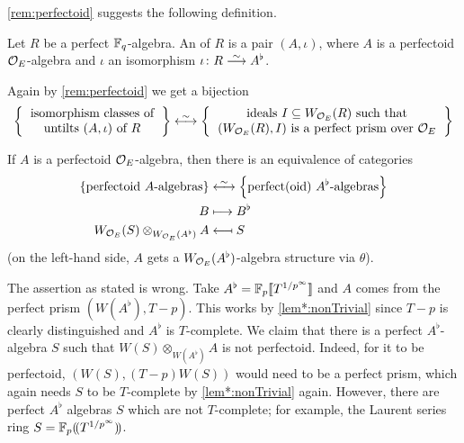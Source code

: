 \cref{rem:perfectoid} suggests the following definition.
\begin{defi}
	Let $R$ be a perfect $\mathbb{F}_q$-algebra. An  of $R$ is a pair $(A,\iota)$, where $A$ is a perfectoid $\mathcal{O}_E$-algebra and $\iota$ an isomorphism $\iota\colon R\isomorphism A^\flat$.
\end{defi}
Again by \cref{rem:perfectoid} we get a bijection
\begin{equation*}
	\left\{\begin{tabular}{c}
		isomorphism classes of\\
		untilts $(A,\iota)$ of $R$
	\end{tabular}\right\}\lrisomorphism \left\{\begin{tabular}{c}
	ideals $I\subseteq W_{\Oo_E}(R)$ such that\\ $(W_{\Oo_E}(R),I)$
	is a perfect prism over $\Oo_E$
	\end{tabular}\right\}
\end{equation*}
\begin{exc}\label{exc:tilting}
	If $A$ is a perfectoid $\mathcal{O}_E$-algebra, then there is an equivalence of categories
	\begin{align*}
		\left\{\text{perfectoid $A$-algebras}\right\}&\lrisomorphism \left\{\text{perfect(oid) $A^\flat$-algebras}\right\}\\
		B&\longmapsto B^\flat\\
		W_{\Oo_E}(S)\otimes_{W_{\Oo_E}(A^\flat)}A&\longmapsfrom S
	\end{align*}
	(on the left-hand side, $A$ gets a $W_{\mathcal{O}_E}(A^\flat)$-algebra structure via $\theta$).
\end{exc}
\begin{proof*}[Disproof]
	The assertion as stated is wrong. Take $A^\flat=\mathbb{F}_p\llbracket T^{1/p^\infty}\rrbracket$ and $A$ comes from the perfect prism $(W(A^\flat),T-p)$. This works by \cref{lem*:nonTrivial} since $T-p$ is clearly distinguished and $A^\flat$ is $T$-complete. We claim that there is a perfect $A^\flat$-algebra $S$ such that $W(S)\otimes_{W(A^\flat)}A$ is not perfectoid. Indeed, for it to be perfectoid, $(W(S),(T-p)W(S))$ would need to be a perfect prism, which again needs $S$ to be $T$-complete by \cref{lem*:nonTrivial} again. However, there are perfect $A^\flat$ algebras $S$ which are not $T$-complete; for example, the Laurent series ring $S=\mathbb{F}_p(\!(T^{1/p^\infty})\!)$.
\end{proof*}
